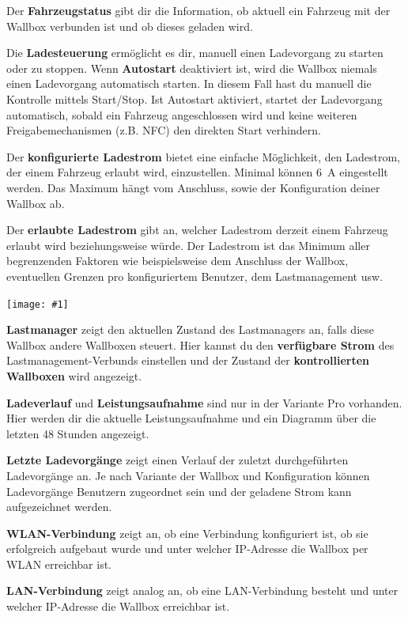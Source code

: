 \documentclass[a4paper,10pt]{article}
\newcommand{\gfx}[1]{\texttt{[image: \#1]}}
\begin{document}
\begin{multicols*}{2}
	Der \textbf{Fahrzeugstatus} gibt dir die Information, ob aktuell ein
	Fahrzeug mit der Wallbox verbunden ist und ob dieses geladen wird.

	Die \textbf{Ladesteuerung} ermöglicht es dir, manuell einen Ladevorgang zu
	starten oder zu stoppen. Wenn \textbf{Autostart} deaktiviert ist, wird die
	Wallbox niemals einen Ladevorgang automatisch starten. In diesem Fall hast du
	manuell die Kontrolle mittels Start/Stop. Ist Autostart aktiviert,
	startet der Ladevorgang automatisch, sobald ein Fahrzeug
	angeschlossen wird und keine weiteren Freigabemechanismen (z.B. NFC) den
	direkten Start verhindern.

	Der \textbf{konfigurierte Ladestrom} bietet eine einfache Möglichkeit, den Ladestrom, der
	einem Fahrzeug erlaubt wird, einzustellen. Minimal können \SI{6}{\ampere} eingestellt werden.
	Das Maximum hängt vom Anschluss, sowie der Konfiguration deiner Wallbox ab.

	Der \textbf{erlaubte Ladestrom} gibt an, welcher Ladestrom derzeit einem Fahrzeug erlaubt
	wird beziehungsweise würde. Der Ladestrom ist das Minimum aller begrenzenden Faktoren wie
	beispielsweise dem Anschluss der Wallbox, eventuellen Grenzen pro konfiguriertem Benutzer,
	dem Lastmanagement usw.

	\gfx{./img_warp2/resized/web_status}

	\textbf{Lastmanager} zeigt den aktuellen Zustand des Lastmanagers an, falls diese Wallbox
	andere Wallboxen steuert. Hier kannst du den \textbf{verfügbare Strom} des Lastmanagement-Verbunds
	einstellen und der Zustand der \textbf{kontrollierten Wallboxen} wird angezeigt.

	\textbf{Ladeverlauf} und \textbf{Leistungsaufnahme} sind nur in der Variante Pro
	vorhanden. Hier werden dir die aktuelle Leistungsaufnahme und ein Diagramm über
	die letzten 48 Stunden angezeigt.

	\textbf{Letzte Ladevorgänge} zeigt einen Verlauf der zuletzt durchgeführten Ladevorgänge an.
	Je nach Variante der Wallbox und Konfiguration können Ladevorgänge Benutzern zugeordnet sein
	und der geladene Strom kann aufgezeichnet werden.

	\textbf{WLAN-Verbindung} zeigt an, ob eine Verbindung konfiguriert ist, ob sie erfolgreich aufgebaut wurde und
	unter welcher IP-Adresse die Wallbox per WLAN erreichbar ist.

	\textbf{LAN-Verbindung} zeigt analog an, ob eine LAN-Verbindung besteht und unter welcher IP-Adresse die Wallbox erreichbar ist.


\end{multicols*}
\end{document}
